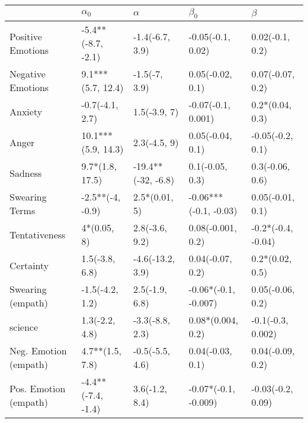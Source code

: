 \begin{tabular}{lllll}
\toprule
{} &          $\alpha_0$ &            $\alpha$ &              $\beta_0$ &             $\beta$ \\
\midrule
Positive Emotions     &  -5.4**(-8.7, -2.1) &     -1.4(-6.7, 3.9) &      -0.05(-0.1, 0.02) &     0.02(-0.1, 0.2) \\
Negative Emotions     &   9.1***(5.7, 12.4) &       -1.5(-7, 3.9) &       0.05(-0.02, 0.1) &    0.07(-0.07, 0.2) \\
Anxiety               &     -0.7(-4.1, 2.7) &        1.5(-3.9, 7) &     -0.07(-0.1, 0.001) &     0.2*(0.04, 0.3) \\
Anger                 &  10.1***(5.9, 14.3) &        2.3(-4.5, 9) &       0.05(-0.04, 0.1) &    -0.05(-0.2, 0.1) \\
Sadness               &     9.7*(1.8, 17.5) &  -19.4**(-32, -6.8) &        0.1(-0.05, 0.3) &     0.3(-0.06, 0.6) \\
Swearing Terms        &    -2.5**(-4, -0.9) &       2.5*(0.01, 5) &  -0.06***(-0.1, -0.03) &    0.05(-0.01, 0.1) \\
Tentativeness         &         4*(0.05, 8) &      2.8(-3.6, 9.2) &      0.08(-0.001, 0.2) &  -0.2*(-0.4, -0.04) \\
Certainty             &      1.5(-3.8, 6.8) &    -4.6(-13.2, 3.9) &       0.04(-0.07, 0.2) &     0.2*(0.02, 0.5) \\
Swearing (empath)     &     -1.5(-4.2, 1.2) &      2.5(-1.9, 6.8) &   -0.06*(-0.1, -0.007) &    0.05(-0.06, 0.2) \\
science               &      1.3(-2.2, 4.8) &     -3.3(-8.8, 2.3) &      0.08*(0.004, 0.2) &   -0.1(-0.3, 0.002) \\
Neg. Emotion (empath) &     4.7**(1.5, 7.8) &     -0.5(-5.5, 4.6) &       0.04(-0.03, 0.1) &    0.04(-0.09, 0.2) \\
Pos. Emotion (empath) &  -4.4**(-7.4, -1.4) &      3.6(-1.2, 8.4) &   -0.07*(-0.1, -0.009) &   -0.03(-0.2, 0.09) \\
\bottomrule
\end{tabular}
